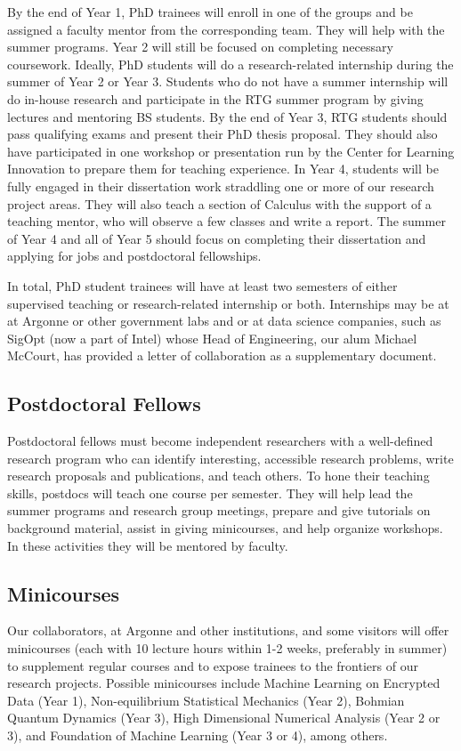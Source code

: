 \documentclass[11pt]{NSFamsart}
\begin{document}
By the end of Year 1, PhD trainees will enroll in one of the groups and be assigned a faculty mentor from the corresponding team. They will   help with the summer programs.   Year 2
will still be focused on completing necessary coursework.
Ideally, PhD students will do a research-related internship during the summer of Year 2 or Year 3. Students who do not have
a summer internship will do in-house research and participate in the RTG summer program
by giving lectures and mentoring BS students. By the end of Year 3, RTG students
should pass qualifying exams and present their PhD thesis proposal. They should also have participated in one   workshop or presentation run by the Center for Learning Innovation to prepare them for teaching experience. In Year 4, students will be fully engaged in their dissertation work straddling one or more of our research project areas. They will also teach a section of Calculus with the support of a teaching
mentor, who will observe a few classes and write a report. The summer of Year 4 and all of Year 5 should focus on completing their dissertation and applying for jobs and postdoctoral fellowships.

In total, PhD student trainees will have at least two semesters of either supervised teaching or research-related internship or both.  Internships may be at at Argonne or other government labs and or at data science companies, such as SigOpt (now a part of Intel) whose Head of Engineering, our alum Michael McCourt, has provided a letter  of collaboration as a supplementary document.

\subsection*{Postdoctoral Fellows}
Postdoctoral fellows must become independent researchers with a well-defined research program who can identify interesting, accessible research problems, write research proposals and publications, and teach others.  To hone their teaching skills, postdocs will teach one course per semester. They will help lead the summer programs and research group meetings, prepare and give tutorials on background material, assist in giving minicourses, and help organize workshops.  In these activities they will be mentored by faculty.

\subsection*{Minicourses}
Our collaborators, at Argonne and other institutions, and some visitors will offer minicourses (each with 10 lecture hours within 1-2 weeks, preferably in summer) to supplement regular courses and to expose trainees to the frontiers of our research projects. Possible minicourses include  Machine Learning on Encrypted Data (Year 1),  Non-equilibrium Statistical Mechanics (Year 2),   Bohmian Quantum Dynamics (Year 3), High Dimensional Numerical Analysis (Year 2 or 3), and Foundation of Machine Learning (Year 3 or 4), among others. 
\end{document}
